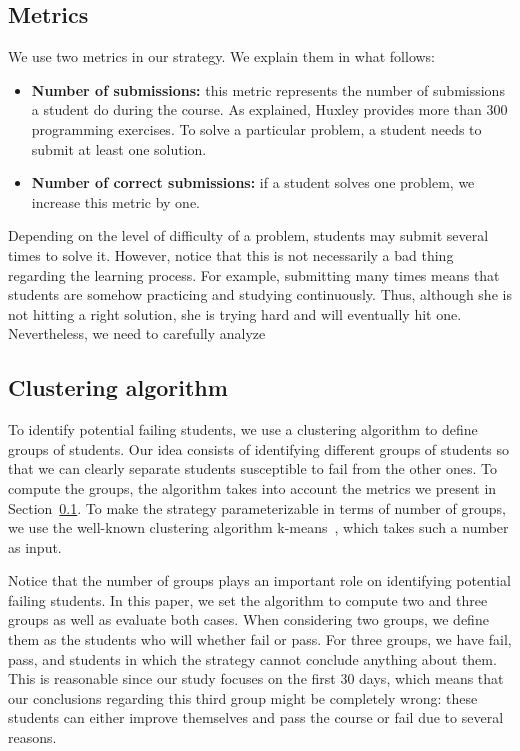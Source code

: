 \subsection{Metrics}

\label{sec:metrics}

We use two metrics in our strategy. We explain them in what follows:

\begin{itemize}

	\item \textbf{Number of submissions:} this metric represents the number of submissions a student do during the course. As explained, Huxley provides more than 300 programming exercises. To solve a particular problem, a student needs to submit at least one solution.

	\item \textbf{Number of correct submissions:} if a student solves one problem, we increase this metric by one.

\end{itemize}

Depending on the level of difficulty of a problem, students may submit several times to solve it. However, notice that this is not necessarily a bad thing regarding the learning process. For example, submitting many times means that students are somehow practicing and studying continuously. Thus, although she is not hitting a right solution, she is trying hard and will eventually hit one. Nevertheless, we need to carefully analyze \todots


\subsection{Clustering algorithm}

To identify potential failing students, we use a clustering algorithm to define groups of students. Our idea consists of identifying different groups of students so that we can clearly separate students susceptible to fail from the other ones. To compute the groups, the algorithm takes into account the metrics we present in Section~\ref{sec:metrics}. To make the strategy parameterizable in terms of number of groups, we use the well-known clustering algorithm k-means~\cite{}, which takes such a number as input.

Notice that the number of groups plays an important role on identifying potential failing students. In this paper, we set the algorithm to compute two and three groups as well as evaluate both cases. When considering two groups, we define them as the students who will whether fail or pass. For three groups, we have fail, pass, and students in which the strategy cannot conclude anything about them. This is reasonable since our study focuses on the first 30 days, which means that our conclusions regarding this third group might be completely wrong: these students can either improve themselves and pass the course or fail due to several reasons.

